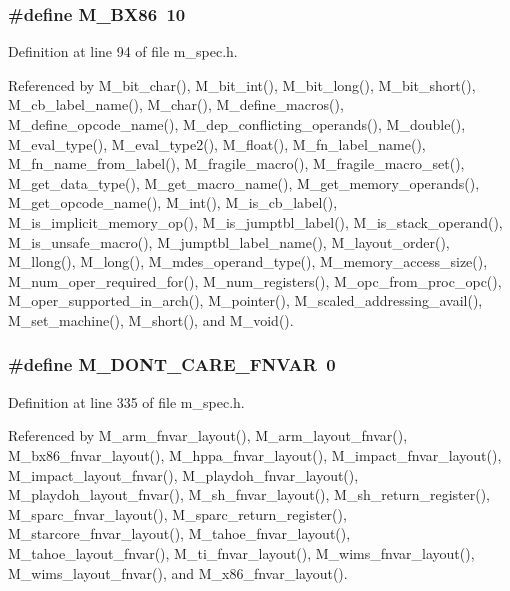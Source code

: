 \subsubsection{\setlength{\rightskip}{0pt plus 5cm}\#define M\_\-BX86~10}\label{m__spec_8h_b844a7b74d0f9a3dce452b870e8fe4aa}




Definition at line 94 of file m\_\-spec.h.

Referenced by M\_\-bit\_\-char(), M\_\-bit\_\-int(), M\_\-bit\_\-long(), M\_\-bit\_\-short(), M\_\-cb\_\-label\_\-name(), M\_\-char(), M\_\-define\_\-macros(), M\_\-define\_\-opcode\_\-name(), M\_\-dep\_\-conflicting\_\-operands(), M\_\-double(), M\_\-eval\_\-type(), M\_\-eval\_\-type2(), M\_\-float(), M\_\-fn\_\-label\_\-name(), M\_\-fn\_\-name\_\-from\_\-label(), M\_\-fragile\_\-macro(), M\_\-fragile\_\-macro\_\-set(), M\_\-get\_\-data\_\-type(), M\_\-get\_\-macro\_\-name(), M\_\-get\_\-memory\_\-operands(), M\_\-get\_\-opcode\_\-name(), M\_\-int(), M\_\-is\_\-cb\_\-label(), M\_\-is\_\-implicit\_\-memory\_\-op(), M\_\-is\_\-jumptbl\_\-label(), M\_\-is\_\-stack\_\-operand(), M\_\-is\_\-unsafe\_\-macro(), M\_\-jumptbl\_\-label\_\-name(), M\_\-layout\_\-order(), M\_\-llong(), M\_\-long(), M\_\-mdes\_\-operand\_\-type(), M\_\-memory\_\-access\_\-size(), M\_\-num\_\-oper\_\-required\_\-for(), M\_\-num\_\-registers(), M\_\-opc\_\-from\_\-proc\_\-opc(), M\_\-oper\_\-supported\_\-in\_\-arch(), M\_\-pointer(), M\_\-scaled\_\-addressing\_\-avail(), M\_\-set\_\-machine(), M\_\-short(), and M\_\-void().
\subsubsection{\setlength{\rightskip}{0pt plus 5cm}\#define M\_\-DONT\_\-CARE\_\-FNVAR~0}\label{m__spec_8h_c831f7abb69d1ea8d21f5d28abdbec5d}




Definition at line 335 of file m\_\-spec.h.

Referenced by M\_\-arm\_\-fnvar\_\-layout(), M\_\-arm\_\-layout\_\-fnvar(), M\_\-bx86\_\-fnvar\_\-layout(), M\_\-hppa\_\-fnvar\_\-layout(), M\_\-impact\_\-fnvar\_\-layout(), M\_\-impact\_\-layout\_\-fnvar(), M\_\-playdoh\_\-fnvar\_\-layout(), M\_\-playdoh\_\-layout\_\-fnvar(), M\_\-sh\_\-fnvar\_\-layout(), M\_\-sh\_\-return\_\-register(), M\_\-sparc\_\-fnvar\_\-layout(), M\_\-sparc\_\-return\_\-register(), M\_\-starcore\_\-fnvar\_\-layout(), M\_\-tahoe\_\-fnvar\_\-layout(), M\_\-tahoe\_\-layout\_\-fnvar(), M\_\-ti\_\-fnvar\_\-layout(), M\_\-wims\_\-fnvar\_\-layout(), M\_\-wims\_\-layout\_\-fnvar(), and M\_\-x86\_\-fnvar\_\-layout().
